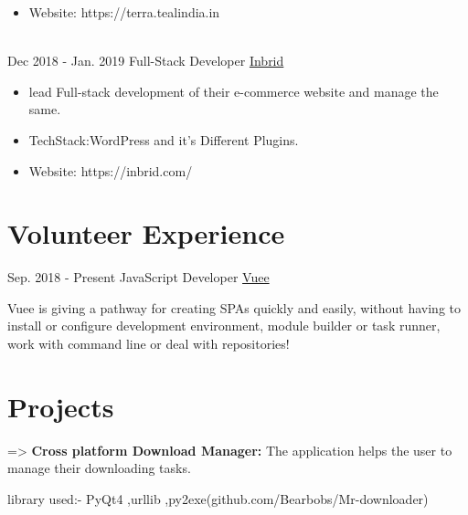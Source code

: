 \documentclass[letterpaper]{twentysecondcv} %
\begin{document}
\begin{twenty}
{{\begin{itemize}
        \item Website: https://terra.tealindia.in
    
    \end{itemize}}
        }
    \\   
    \twentyitem
   		{Dec 2018 -}
		{Jan. 2019}
        {Full-Stack Developer}
        {\href{https://inbrid.com/}{Inbrid}}
        {}
        {
        {\begin{itemize}
        \item  lead Full-stack development of their e-commerce website and manage the same.
        
        \item TechStack:WordPress and it's Different Plugins.
        
        \item Website: https://inbrid.com/
    \end{itemize}}
        }
    
        
\end{twenty}

\section{Volunteer Experience}
\begin{twenty}
	\twentyitem
    	{Sep. 2018 - }
		{Present}
        {JavaScript Developer}
        {\href{https://vuee.info/}{Vuee}}
        {}
        {
       	\textbf{}Vuee is giving a pathway for creating SPAs quickly and easily, without having to install or configure development environment, module builder or task runner, work with command line or deal with repositories!
        {\begin{itemize}
         \vspace{2mm}
		\end{itemize}}
        }
\end{twenty}

\section{Projects}
=> \textbf{Cross platform Download Manager:}
The application helps the user to manage their downloading tasks.

library used:- PyQt4 ,urllib ,py2exe(github.com/Bearbobs/Mr-downloader)
\end{document}
